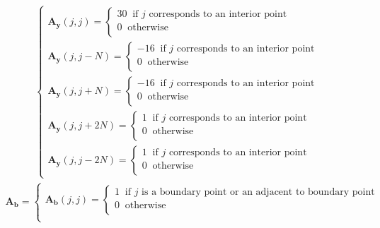 \documentclass[12 pt, final]{article}
\begin{document}
\begin{itemize}
\begin{itemize}
\begin{enumerate}
\begin{align*}
\begin{cases}
                    \mathbf{A_y}(j,j) =
                    \begin{cases}
                    30 \: \text{ if $j$ corresponds to an interior point}\:\\
                    0 \: \text{ otherwise}\:\\
                    \end{cases}\\
                    \mathbf{A_y}(j,j-N) =
                    \begin{cases}
                    -16 \: \text{ if $j$ corresponds to an interior point}\:\\
                    0 \: \text{ otherwise}\:\\
                    \end{cases}\\
                    \mathbf{A_y}(j,j+N) =
                    \begin{cases}
                    -16 \: \text{ if $j$ corresponds to an interior point}\:\\
                    0 \: \text{ otherwise}\:\\
                    \end{cases}\\
                    \mathbf{A_y}(j,j+2N) =
                    \begin{cases}
                    1 \: \text{ if $j$ corresponds to an interior point}\:\\
                    0 \: \text{ otherwise}\:\\
                    \end{cases}\\
                    \mathbf{A_y}(j,j-2N) =
                    \begin{cases}
                    1 \: \text{ if $j$ corresponds to an interior point}\:\\
                    0 \: \text{ otherwise}\:\\
                    \end{cases}                    
                    \end{cases}
            \end{align*}
        \begin{align*}
                    \mathbf{A_b} = \begin{cases}
                    \mathbf{A_b}(j,j) =
                    \begin{cases}
                    1 \: \text{ if $j$ is a boundary point or an adjacent to boundary point}\:\\
                    0 \: \text{ otherwise}\:\\
                    \end{cases}\\
                    \end{cases}
            \end{align*}


\end{enumerate}
\end{itemize}
\end{itemize}
\end{document}
